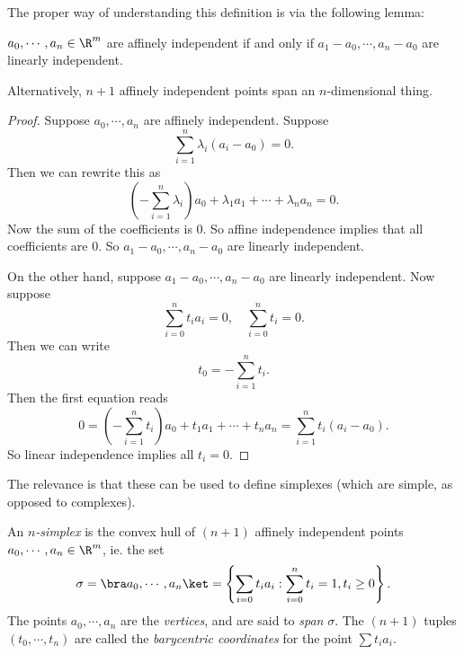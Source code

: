 \documentclass[a4paper]{article}
\begin{document}
The proper way of understanding this definition is via the following lemma:
\begin{lemma}
  $a_0, \cdots, a_n \in \R^m$ are affinely independent if and only if $a_1 - a_0, \cdots, a_n - a_0$ are linearly independent.
\end{lemma}
Alternatively, $n + 1$ affinely independent points span an $n$-dimensional thing.

\begin{proof}
  Suppose $a_0, \cdots, a_n$ are affinely independent. Suppose
  \[
    \sum_{i = 1}^n \lambda_i (a_i - a_0) = 0.
  \]
  Then we can rewrite this as
  \[
    \left(-\sum_{i = 1}^n \lambda_i\right)a_0 + \lambda_1 a_1 + \cdots + \lambda_n a_n = 0.
  \]
  Now the sum of the coefficients is $0$. So affine independence implies that all coefficients are $0$. So $a_1 - a_0, \cdots, a_n - a_0$ are linearly independent.

  On the other hand, suppose $a_1 - a_0, \cdots, a_n - a_0$ are linearly independent. Now suppose
  \[
    \sum_{i = 0}^n t_i a_i = 0,\quad \sum_{i = 0}^n t_i = 0.
  \]
  Then we can write
  \[
    t_0 = -\sum_{i = 1}^n t_i.
  \]
  Then the first equation reads
  \[
    0 = \left(-\sum_{i = 1}^n t_i \right)a_0 + t_1 a_1 + \cdots + t_n a_n = \sum_{i = 1}^n t_i (a_i - a_0).
  \]
  So linear independence implies all $t_i = 0$.
\end{proof}

The relevance is that these can be used to define simplexes (which are simple, as opposed to complexes).
\begin{defi}[$n$-simplex]
  An \emph{$n$-simplex} is the convex hull of $(n + 1)$ affinely independent points $a_0, \cdots, a_n \in \R^m$, ie. the set
  \[
    \sigma = \bra a_0, \cdots, a_n\ket = \left\{\sum_{i = 0} t_i a_i : \sum_{i = 0}^n t_i = 1,t_i \geq 0\right\}.
  \]
  The points $a_0, \cdots, a_n$ are the \emph{vertices}, and are said to \emph{span} $\sigma$. The $(n + 1)$ tuples $(t_0, \cdots, t_n)$ are called the \emph{barycentric coordinates} for the point $\sum t_i a_i$.
\end{defi}
\end{document}
